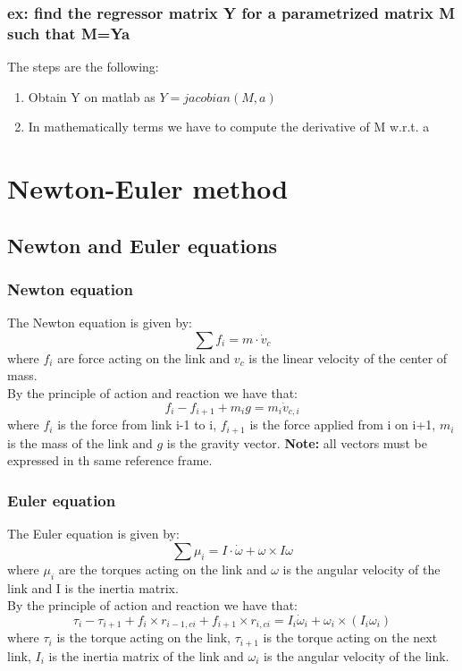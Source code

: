 \documentclass[a4paper,12pt]{article}
\begin{document}
\subsubsection{ex: find the regressor matrix Y for a parametrized matrix M such that M=Ya}
The steps are the following:
\begin{enumerate}
    \item Obtain Y on matlab as $Y = jacobian(M,a)$
    \item In mathematically terms we have to compute the 
    derivative of M w.r.t. a
\end{enumerate}





\section{Newton-Euler method}
\subsection{Newton and Euler equations}
\subsubsection{Newton equation}
The Newton equation is given by:
\begin{equation}
    \sum{f}_i = m \cdot \dot{v}_c
\end{equation}
where $f_i$ are force acting on the link and $v_c$ is the
 linear velocity of the center of mass.\\
 By the principle of action and reaction we have that:
    \begin{equation}
        f_i -f_{i+1} +m_ig = m_i \dot{v}_{c,i}
    \end{equation}
    where $f_i$ is the force from link i-1 to i, $f_{i+1}$ is 
    the force applied from i on i+1, $m_i$ is the mass of the 
    link and $g$ is the gravity vector.
    \textbf{Note:} all vectors must be expressed in th same 
    reference frame.
\subsubsection{Euler equation}
The Euler equation is given by:
\begin{equation}
    \sum{\mu}_i = I \cdot \dot{\omega} + \omega \times I \omega
\end{equation}
where $\mu_i$ are the torques acting on the link
 and $\omega$ is the angular velocity of the link and I
  is the inertia matrix.\\
  By the principle of action and reaction we have that:
    \begin{equation}
        \tau_i -\tau_{i+1} + f_i \times r_{i-1,ci} + f_{i+1} \times r_{i,ci} = I_i \dot{\omega}_i + \omega_i \times (I_i \omega_i)
    \end{equation}
    where $\tau_i$ is the torque acting on the link, $\tau_{i+1}$ is 
    the torque acting on the next link, $I_i$ is the inertia matrix of the 
    link and $\omega_i$ is the angular velocity of the link.
\end{document}
